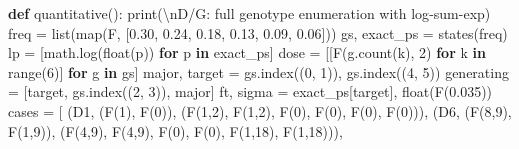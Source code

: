 \documentclass[
]{article}
\newenvironment{Shaded}{}{}
\newcommand{\BuiltInTok}[1]{\textcolor[rgb]{0.00,0.50,0.00}{#1}}
\newcommand{\CharTok}[1]{\textcolor[rgb]{0.25,0.44,0.63}{#1}}
\newcommand{\ControlFlowTok}[1]{\textcolor[rgb]{0.00,0.44,0.13}{\textbf{#1}}}
\newcommand{\DecValTok}[1]{\textcolor[rgb]{0.25,0.63,0.44}{#1}}
\newcommand{\KeywordTok}[1]{\textcolor[rgb]{0.00,0.44,0.13}{\textbf{#1}}}
\newcommand{\NormalTok}[1]{#1}
\newcommand{\OperatorTok}[1]{\textcolor[rgb]{0.40,0.40,0.40}{#1}}
\newcommand{\StringTok}[1]{\textcolor[rgb]{0.25,0.44,0.63}{#1}}
\begin{document}
\begin{Shaded}
\begin{Highlighting}[]
\KeywordTok{def}\NormalTok{ quantitative():}
    \BuiltInTok{print}\NormalTok{(}\StringTok{\textquotesingle{}}\CharTok{\textbackslash{}n}\StringTok{D/G: full genotype enumeration with log{-}sum{-}exp\textquotesingle{}}\NormalTok{)}
\NormalTok{    freq }\OperatorTok{=} \BuiltInTok{list}\NormalTok{(}\BuiltInTok{map}\NormalTok{(F, [}\StringTok{\textquotesingle{}0.30\textquotesingle{}}\NormalTok{, }\StringTok{\textquotesingle{}0.24\textquotesingle{}}\NormalTok{, }\StringTok{\textquotesingle{}0.18\textquotesingle{}}\NormalTok{, }\StringTok{\textquotesingle{}0.13\textquotesingle{}}\NormalTok{, }\StringTok{\textquotesingle{}0.09\textquotesingle{}}\NormalTok{, }\StringTok{\textquotesingle{}0.06\textquotesingle{}}\NormalTok{]))}
\NormalTok{    gs, exact\_ps }\OperatorTok{=}\NormalTok{ states(freq)}
\NormalTok{    lp }\OperatorTok{=}\NormalTok{ [math.log(}\BuiltInTok{float}\NormalTok{(p)) }\ControlFlowTok{for}\NormalTok{ p }\KeywordTok{in}\NormalTok{ exact\_ps]}
\NormalTok{    dose }\OperatorTok{=}\NormalTok{ [[F(g.count(k), }\DecValTok{2}\NormalTok{) }\ControlFlowTok{for}\NormalTok{ k }\KeywordTok{in} \BuiltInTok{range}\NormalTok{(}\DecValTok{6}\NormalTok{)] }\ControlFlowTok{for}\NormalTok{ g }\KeywordTok{in}\NormalTok{ gs]}
\NormalTok{    major, target }\OperatorTok{=}\NormalTok{ gs.index((}\DecValTok{0}\NormalTok{, }\DecValTok{1}\NormalTok{)), gs.index((}\DecValTok{4}\NormalTok{, }\DecValTok{5}\NormalTok{))}
\NormalTok{    generating }\OperatorTok{=}\NormalTok{ [target, gs.index((}\DecValTok{2}\NormalTok{, }\DecValTok{3}\NormalTok{)), major]}
\NormalTok{    ft, sigma }\OperatorTok{=}\NormalTok{ exact\_ps[target], }\BuiltInTok{float}\NormalTok{(F(}\StringTok{\textquotesingle{}0.035\textquotesingle{}}\NormalTok{))}
\NormalTok{    cases }\OperatorTok{=}\NormalTok{ [}
\NormalTok{        (}\StringTok{\textquotesingle{}D1\textquotesingle{}}\NormalTok{, (F(}\DecValTok{1}\NormalTok{), F(}\DecValTok{0}\NormalTok{)), (F(}\DecValTok{1}\NormalTok{,}\DecValTok{2}\NormalTok{), F(}\DecValTok{1}\NormalTok{,}\DecValTok{2}\NormalTok{), F(}\DecValTok{0}\NormalTok{), F(}\DecValTok{0}\NormalTok{), F(}\DecValTok{0}\NormalTok{), F(}\DecValTok{0}\NormalTok{))),}
\NormalTok{        (}\StringTok{\textquotesingle{}D6\textquotesingle{}}\NormalTok{, (F(}\DecValTok{8}\NormalTok{,}\DecValTok{9}\NormalTok{), F(}\DecValTok{1}\NormalTok{,}\DecValTok{9}\NormalTok{)), (F(}\DecValTok{4}\NormalTok{,}\DecValTok{9}\NormalTok{), F(}\DecValTok{4}\NormalTok{,}\DecValTok{9}\NormalTok{), F(}\DecValTok{0}\NormalTok{), F(}\DecValTok{0}\NormalTok{), F(}\DecValTok{1}\NormalTok{,}\DecValTok{18}\NormalTok{), F(}\DecValTok{1}\NormalTok{,}\DecValTok{18}\NormalTok{))),}

\end{Highlighting}
\end{Shaded}
\end{document}
